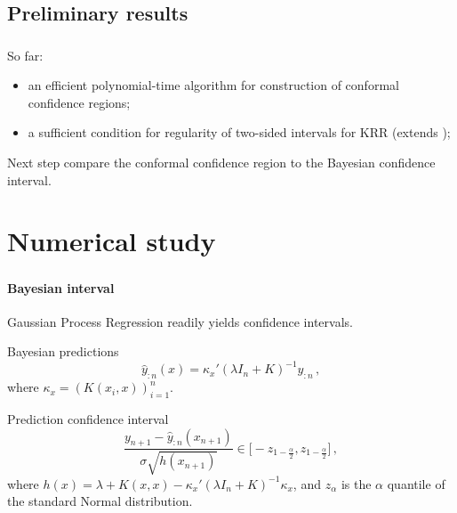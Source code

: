 \documentclass[t]{beamer}  %
\begin{document}
\subsection{Preliminary results} %
\label{sub:preliminary_results}

\begin{frame}[c]\frametitle{\insertsection}
  \framesubtitle{\insertsubsection}
  \begin{block}{So far:}
  \begin{itemize}
    \item an efficient polynomial-time algorithm for construction of conformal
    confidence regions;
    \item a sufficient condition for regularity of two-sided intervals for KRR
    (extends \cite{burnaevV14});
  \end{itemize}
  \end{block}
  \begin{block}{Next step}
    compare the conformal confidence region to the Bayesian confidence interval.
  \end{block}
\end{frame}



\section{Numerical study} %
\label{sec:Numerical_study}

\begin{frame}[c]\frametitle{\insertsection}
  \framesubtitle{Bayesian interval}
  Gaussian Process Regression readily yields confidence intervals.
  \vspace{\baselineskip}
  \begin{block}{Bayesian predictions}
    $$ \hat{y}_{:n}(x) = \kappa_x' (\lambda I_n + K)^{-1} y_{:n} \,, $$
    where $\kappa_x = (K(x_i, x))_{i=1}^n$.
  \end{block}

  \begin{block}{Prediction confidence interval}
    $$ \frac{y_{n+1} - \hat{y}_{:n}(x_{n+1})}{\sigma \sqrt{h(x_{n+1})}} \in
      \bigl[- z_{1-\frac{\alpha}{2}}, z_{1-\frac{\alpha}{2}} \bigr] \,, $$
    where $ h(x) = \lambda + K(x,x) - \kappa_x' (\lambda I_n + K)^{-1} \kappa_x$,
    and $z_\alpha$ is the $\alpha$ quantile of the standard Normal distribution.
  \end{block}
\end{frame}
\end{document}
